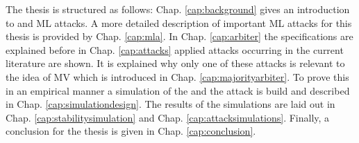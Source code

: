 The thesis is structured as follows: 
Chap. \ref{cap:background} gives an introduction to \pufs and \ac{ML} attacks.
A more detailed description of important \ac{ML} attacks for this thesis is provided by Chap. \ref{cap:mla}.
In Chap. \ref{cap:arbiter} the \apuf specifications are explained before in Chap. \ref{cap:attacks} applied attacks occurring in the current literature are shown.
It is explained why only one of these attacks is relevant to the idea of \ac{MV} which is introduced in Chap. \ref{cap:majorityarbiter}. %
To prove this in an empirical manner a simulation of the \apuf and the attack is build and described in Chap. \ref{cap:simulationdesign}.
The results of the simulations are laid out in Chap. \ref{cap:stabilitysimulation} and Chap. \ref{cap:attacksimulations}.
Finally, a conclusion for the thesis is given in Chap. \ref{cap:conclusion}.

